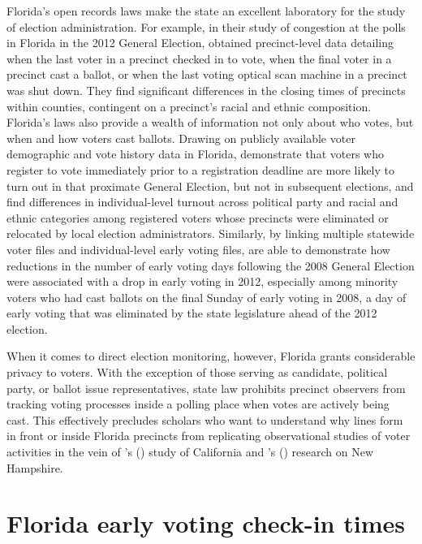 \documentclass[12pt,titlepage]{article}
\newcommand{\possessivecite}[1]{\citeauthor{#1}'s (\citeyear{#1})}
\begin{document}
Florida's open records laws make the state an excellent laboratory for
the study of election administration. For example, in their study of
congestion at the polls in Florida in the 2012 General Election,
\cite{herronsmith:closingtimes} obtained precinct-level data detailing
when the last voter in a precinct checked in to vote, when the final
voter in a precinct cast a ballot, or when the last voting optical
scan machine in a precinct was shut down. They find significant
differences in the closing times of precincts within counties,
contingent on a precinct's racial and ethnic composition. Florida's
laws also provide a wealth of information not only about who votes,
but when and how voters cast ballots.  Drawing on publicly available
voter demographic and vote history data in Florida, \cite{shinosmith:registrationtiming}
demonstrate that voters who register to vote immediately prior to a registration deadline are more
likely to turn out in that proximate General Election, but not in subsequent elections, and 
\cite{amos_etal2017} find differences in individual-level turnout
across political party and racial and ethnic categories among
registered voters whose precincts were eliminated or relocated by
local election administrators.  Similarly, by linking multiple
statewide voter files and individual-level early voting files,
\cite{herron_smith2014} are able to demonstrate how reductions in the
number of early voting days following the 2008 General Election were
associated with a drop in early voting in 2012, especially among
minority voters who had cast ballots on the final Sunday of early
voting in 2008, a day of early voting that was eliminated by the state
legislature ahead of the 2012 election.

When it comes to direct election monitoring, however, Florida grants
considerable privacy to voters.  With the exception of those serving
as candidate, political party, or ballot issue representatives, state
law prohibits precinct observers from tracking voting processes inside
a polling place when votes are actively being cast. This effectively
precludes scholars who want to understand why lines form in front or
inside Florida precincts from replicating observational studies of
voter activities in the vein of
\possessivecite{spencermarkovits:renege} study of California and
\possessivecite{herronsmith:hanoverstudy} research on New Hampshire.

\section*{Florida early voting check-in times}
\end{document}
